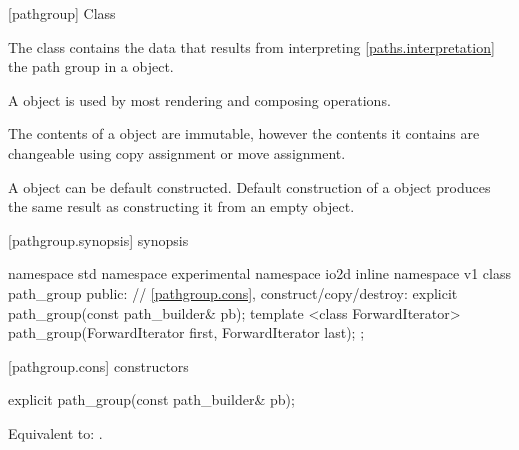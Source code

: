 [pathgroup] {Class }

\pnum
{}
The class  contains the data that results from interpreting \ref{paths.interpretation} the path group in a  object.

\pnum
A  object is used by most rendering and composing operations.

\pnum
The contents of a  object are immutable, however the contents it contains are changeable using copy assignment or move assignment.

\pnum
A  object can be default constructed. Default construction of a  object produces the same result as constructing it from an empty  object.
%

%
 [pathgroup.synopsis] { synopsis}

\begin{codeblock}
namespace std { namespace experimental { namespace io2d { inline namespace v1 {
  class path_group {
    public:
    // \ref{pathgroup.cons}, construct/copy/destroy:
    explicit path_group(const path_builder& pb);
    template <class ForwardIterator>
    path_group(ForwardIterator first, ForwardIterator last);
  };
} } } }
\end{codeblock}

 [pathgroup.cons] { constructors}

\begin{itemdecl}
    explicit path_group(const path_builder& pb);
\end{itemdecl}
\begin{itemdescr}
\pnum
\effects
Equivalent to: .	
\end{itemdescr}

